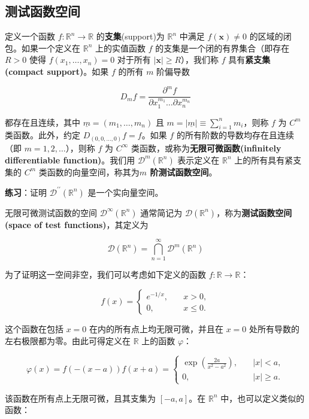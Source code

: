 \subsection{测试函数空间}

定义一个函数 $f: \mathbb{R}^n \rightarrow \mathbb{R}$
的\textbf{支集}(support)为 $\mathbb{R}^n$ 中满足
$f(\mathbf{x}) \neq 0$ 的区域的闭包。如果一个定义在 $\mathbb{R}^n$
上的实值函数 $f$ 的支集是一个闭的有界集合（即存在 $R>0$ 使得
$f(x_1, \ldots, x_n)=0$ 对于所有 $|\mathbf{x}| \geq R$），我们称
$f$ 具有\textbf{紧支集(compact support)}。如果 $f$ 的所有 $m$
阶偏导数

$$
D_m f = \frac{\partial^m f}{\partial x_1^{m_1} \ldots \partial x_n^{m_n}}
$$

都存在且连续，其中 $\underline{m} = (m_1, \ldots, m_n)$ 且
$m = |\underline{m}| \equiv \sum_{i=1}^n m_i$，则称 $f$ 为 $C^m$
类函数。此外，约定 $D_{(0,0,\ldots,0)} f = f$。如果 $f$
的所有阶数的导数均存在且连续（即 $m = 1, 2, \ldots$），则称 $f$ 为
$C^{\infty}$ 类函数，或称为\textbf{无限可微函数(infinitely
differentiable function)}。我们用 $\mathcal{D}^m(\mathbb{R}^n)$
表示定义在 $\mathbb{R}^n$ 上的所有具有紧支集的 $C^m$
类函数的向量空间，称其为\textbf{$m$ 阶测试函数空间}。

\textbf{练习}：证明 $\mathcal{D}^{\prime \prime}(\mathbb{R}^n)$
是一个实向量空间。

无限可微测试函数的空间 $\mathcal{D}^\infty(\mathbb{R}^n)$ 通常简记为
$\mathcal{D}(\mathbb{R}^n)$，称为\textbf{测试函数空间(space of test functions)}，其定义为

$$
\mathcal{D}(\mathbb{R}^n) = \bigcap_{n=1}^\infty \mathcal{D}^m(\mathbb{R}^n)
$$

为了证明这一空间非空，我们可以考虑如下定义的函数
$f: \mathbb{R} \rightarrow \mathbb{R}$：

$$
f(x) =
\begin{cases}
e^{-1 / x}, & \quad x > 0, \\
0, & \quad x \leq 0.
\end{cases}
$$

这个函数在包括 $x=0$ 在内的所有点上均无限可微，并且在 $x=0$
处所有导数的左右极限都为零。由此可得定义在 $\mathbb{R}$ 上的函数
$\varphi$：

$$
\varphi(x) = f(-(x-a)) f(x+a) =
\begin{cases}
\exp\left(\frac{2a}{x^2 - a^2}\right), & \quad |x| < a, \\
0, & \quad |x| \geq a.
\end{cases}
$$

该函数在所有点上无限可微，且其支集为 $[-a, a]$。在 $\mathbb{R}^n$
中，也可以定义类似的函数：

